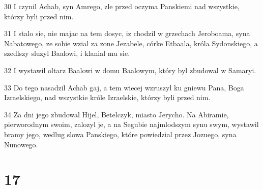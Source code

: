 \par 30 I czynil Achab, syn Amrego, zle przed oczyma Panskiemi nad wszystkie, którzy byli przed nim.
\par 31 I stalo sie, nie majac na tem dosyc, iz chodzil w grzechach Jeroboama, syna Nabatowego, ze sobie wzial za zone Jezabele, córke Etbaala, króla Sydonskiego, a szedlszy sluzyl Baalowi, i klanial mu sie.
\par 32 I wystawil oltarz Baalowi w domu Baalowym, który byl zbudowal w Samaryi.
\par 33 Do tego nasadzil Achab gaj, a tem wiecej wzruszyl ku gniewu Pana, Boga Izraelskiego, nad wszystkie króle Izraelskie, którzy byli przed nim.
\par 34 Za dni jego zbudowal Hijel, Betelczyk, miasto Jerycho. Na Abiramie, pierworodnym swoim, zalozyl je, a na Segubie najmlodszym synu swym, wystawil bramy jego, wedlug slowa Panskiego, które powiedzial przez Jozuego, syna Nunowego.

\chapter{17}

